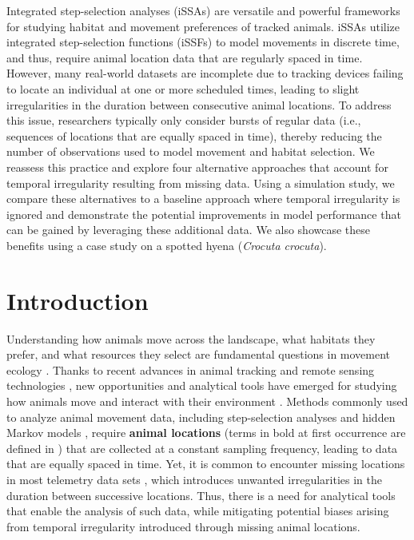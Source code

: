 \documentclass[../FinalThesis.tex]{subfiles}
\begin{document}
Integrated step-selection analyses (iSSAs) are versatile and powerful frameworks
for studying habitat and movement preferences of tracked animals. iSSAs utilize
integrated step-selection functions (iSSFs) to model movements in discrete time,
and thus, require animal location data that are regularly spaced in time.
However, many real-world datasets are incomplete due to tracking devices failing
to locate an individual at one or more scheduled times, leading to slight
irregularities in the duration between consecutive animal locations. To address
this issue, researchers typically only consider bursts of regular data (i.e.,
sequences of locations that are equally spaced in time), thereby reducing the
number of observations used to model movement and habitat selection. We reassess
this practice and explore four alternative approaches that account for temporal
irregularity resulting from missing data. Using a simulation study, we compare
these alternatives to a baseline approach where temporal irregularity is ignored
and demonstrate the potential improvements in model performance that can be
gained by leveraging these additional data. We also showcase these benefits
using a case study on a spotted hyena (\textit{Crocuta crocuta}).

\newpage
\section{Introduction}

Understanding how animals move across the landscape, what habitats they prefer,
and what resources they select are fundamental questions in movement ecology
\citep{Nathan.2008}. Thanks to recent advances in animal tracking
\citep{Cagnacci.2010, Williams.2019, Beardsworth.2022} and remote sensing
technologies \citep{Toth.2016, Rumiano.2020}, new opportunities and analytical
tools have emerged for studying how animals move and interact with their
environment \citep{Tomkiewicz.2010, Kays.2015, Nathan.2022}. Methods commonly
used to analyze animal movement data, including step-selection analyses
\citep{Fortin.2005, Thurfjell.2014, Fieberg.2021} and hidden Markov models
\citep{Michelot.2016}, require \textbf{animal locations} (terms in bold at first
occurrence are defined in ) that are collected at a constant
sampling frequency, leading to data that are equally spaced in time. Yet, it is
common to encounter missing locations in most telemetry data sets
\citep{Frair.2010, Hofman.2019, Vales.2022}, which introduces unwanted
irregularities in the duration between successive locations. Thus, there is a
need for analytical tools that enable the analysis of such data, while
mitigating potential biases arising from temporal irregularity introduced
through missing animal locations.
\end{document}
